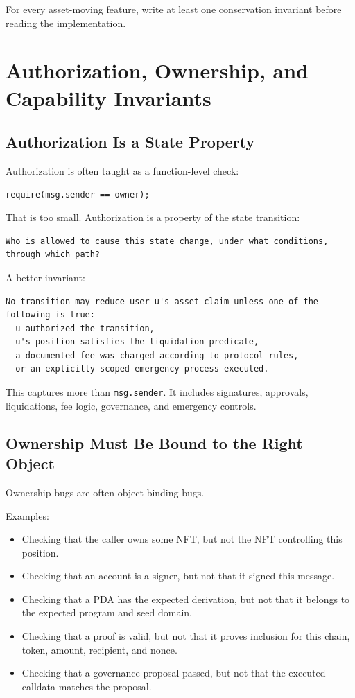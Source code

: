 For every asset-moving feature, write at least one conservation
invariant before reading the implementation.

\section{Authorization, Ownership, and Capability Invariants}

\subsection{Authorization Is a State Property}

Authorization is often taught as a function-level check:

\begin{lstlisting}
require(msg.sender == owner);
\end{lstlisting}

That is too small. Authorization is a property of the state transition:

\begin{lstlisting}
Who is allowed to cause this state change, under what conditions, through which path?
\end{lstlisting}

A better invariant:

\begin{lstlisting}
No transition may reduce user u's asset claim unless one of the following is true:
  u authorized the transition,
  u's position satisfies the liquidation predicate,
  a documented fee was charged according to protocol rules,
  or an explicitly scoped emergency process executed.
\end{lstlisting}

This captures more than \passthrough{\lstinline!msg.sender!}. It
includes signatures, approvals, liquidations, fee logic, governance, and
emergency controls.

\subsection{Ownership Must Be Bound to the Right Object}

Ownership bugs are often object-binding bugs.

Examples:

\begin{itemize}
\tightlist
\item
  Checking that the caller owns some NFT, but not the NFT controlling
  this position.
\item
  Checking that an account is a signer, but not that it signed this
  message.
\item
  Checking that a PDA has the expected derivation, but not that it
  belongs to the expected program and seed domain.
\item
  Checking that a proof is valid, but not that it proves inclusion for
  this chain, token, amount, recipient, and nonce.
\item
  Checking that a governance proposal passed, but not that the executed
  calldata matches the proposal.
\end{itemize}

